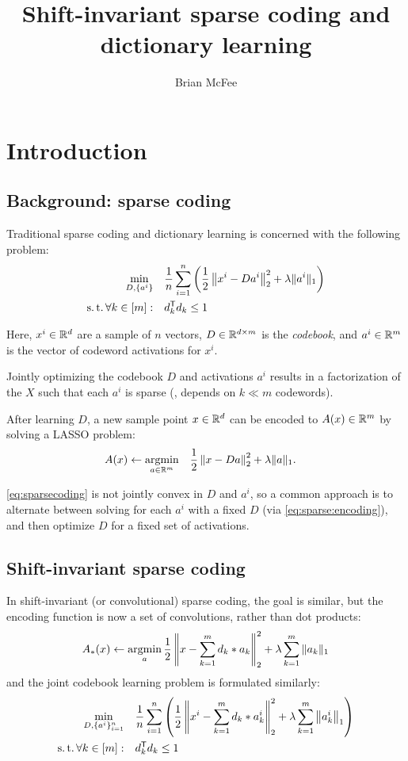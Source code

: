 \documentclass{article}
\title{Shift-invariant sparse coding and dictionary learning}
\author{Brian McFee}
\begin{document}
\maketitle

\section{Introduction}

\subsection{Background: sparse coding}

Traditional sparse coding and dictionary learning is concerned with the following problem:
\begin{align}
\min_{D, \{a^i\}} \quad& \frac{1}{n} \sum_{i=1}^n \left(\frac{1}{2} \left\|x^i - Da^i\right\|_2^2 + \lambda \|a^i\|_1\right) \notag\\
\operatorname{s.t.} \forall k \in [m]:\quad& d_k^\mathsf{T} d_k \leq 1 \label{eq:sparsecoding}
\end{align}

Here, $x^i\in\mathbb{R}^{d}$ are a sample of $n$ vectors, $D\in\mathbb{R}^{d\times m}$ is the
\emph{codebook}, and $a^i\in\mathbb{R}^{m}$ is the vector of codeword activations for $x^i$.

Jointly optimizing the codebook $D$ and activations $a^i$ results in a factorization of the $X$ such that
each $a^i$ is sparse (\eg, depends on $k \ll m$ codewords).

After learning $D$, a new sample point $x \in \mathbb{R}^d$ can be encoded to $A(x) \in \mathbb{R}^m$ by solving a LASSO problem:
\begin{align}
A(x) \leftarrow \operatorname*{argmin}_{a\in\mathbb{R}^m} \quad & \frac{1}{2} \left\| x - Da\right\|_2^2 + \lambda \|a\|_1.
\label{eq:sparse:encoding}
\end{align}

\autoref{eq:sparsecoding} is not jointly convex in $D$ and $a^i$, so a common approach is to alternate between solving for each $a^i$ with a fixed $D$ (via \autoref{eq:sparse:encoding}), 
and then optimize $D$ for a fixed set of activations.

\subsection{Shift-invariant sparse coding}

In shift-invariant (or convolutional) sparse coding, the goal is similar, but the encoding
function is now a set of convolutions, rather than dot products:
\begin{align}
A_*(x) \leftarrow \operatorname*{argmin}_a \frac{1}{2} \left\|x - \sum_{k=1}^m d_k * a_k \right\|_2^2 + \lambda
\sum_{k=1}^m \|a_k\|_1 \label{eq:sisc}
\end{align}
and the joint codebook learning problem is formulated similarly:
\begin{align}
\min_{D, \{a^i\}_{i=1}^n} \quad & \frac{1}{n}\sum_{i=1}^n \left( \frac{1}{2} \left\| x^i - \sum_{k=1}^m
d_k * a^i_k \right\|_2^2 + \lambda \sum_{k=1}^m \left\|a^i_k\right\|_1 \right) \notag\\
\operatorname{s.t.} \forall k \in [m]:\quad& d_k^\mathsf{T} d_k \leq 1
\end{align}
\end{document}
